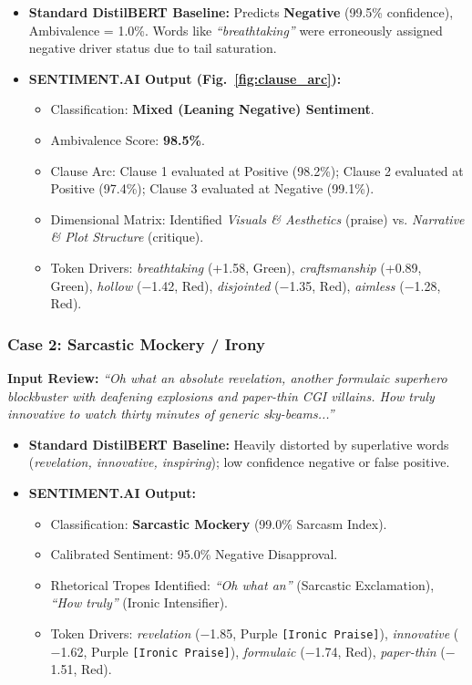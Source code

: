 \documentclass[conference]{IEEEtran}
\begin{document}
\begin{itemize}
    \item \textbf{Standard DistilBERT Baseline:} Predicts \textbf{Negative} (99.5\% confidence), Ambivalence = 1.0\%. Words like \textit{``breathtaking''} were erroneously assigned negative driver status due to tail saturation.
    \item \textbf{SENTIMENT.AI Output (Fig.~\ref{fig:clause_arc}):} 
    \begin{itemize}
        \item Classification: \textbf{Mixed (Leaning Negative) Sentiment}.
        \item Ambivalence Score: \textbf{98.5\%}.
        \item Clause Arc: Clause 1 evaluated at Positive (98.2\%); Clause 2 evaluated at Positive (97.4\%); Clause 3 evaluated at Negative (99.1\%).
        \item Dimensional Matrix: Identified \textit{Visuals \& Aesthetics} (praise) vs. \textit{Narrative \& Plot Structure} (critique).
        \item Token Drivers: \textit{breathtaking} (+1.58, Green), \textit{craftsmanship} (+0.89, Green), \textit{hollow} ($-$1.42, Red), \textit{disjointed} ($-$1.35, Red), \textit{aimless} ($-$1.28, Red).
    \end{itemize}
\end{itemize}

\subsubsection{Case 2: Sarcastic Mockery / Irony}
\textbf{Input Review:} \textit{``Oh what an absolute revelation, another formulaic superhero blockbuster with deafening explosions and paper-thin CGI villains. How truly innovative to watch thirty minutes of generic sky-beams...''}

\begin{itemize}
    \item \textbf{Standard DistilBERT Baseline:} Heavily distorted by superlative words (\textit{revelation, innovative, inspiring}); low confidence negative or false positive.
    \item \textbf{SENTIMENT.AI Output:}
    \begin{itemize}
        \item Classification: \textbf{Sarcastic Mockery} (99.0\% Sarcasm Index).
        \item Calibrated Sentiment: 95.0\% Negative Disapproval.
        \item Rhetorical Tropes Identified: \textit{``Oh what an''} (Sarcastic Exclamation), \textit{``How truly''} (Ironic Intensifier).
        \item Token Drivers: \textit{revelation} ($-$1.85, Purple \texttt{[Ironic Praise]}), \textit{innovative} ($-$1.62, Purple \texttt{[Ironic Praise]}), \textit{formulaic} ($-$1.74, Red), \textit{paper-thin} ($-$1.51, Red).
    \end{itemize}
\end{itemize}
\end{document}
